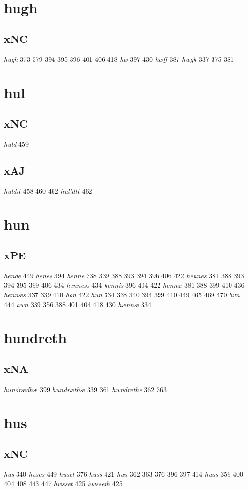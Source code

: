 \documentclass[a4paper,twocolumn]{article}
\begin{document}
\section{hugh}
\label{sec:org77df400}
\subsection{xNC}
\label{sec:org60e1a54}
\emph{hugh} 373 379 394 395 396 401 406 418 \emph{hw} 397 430 \emph{hwff} 387 \emph{hwgh} 337 375 381 
\section{hul}
\label{sec:orgc912211}
\subsection{xNC}
\label{sec:org2108ac0}
\emph{huld} 459 
\subsection{xAJ}
\label{sec:org17b45ab}
\emph{huldtt} 458 460 462 \emph{hulldtt} 462 
\section{hun}
\label{sec:orgfeeb3c3}
\subsection{xPE}
\label{sec:orgb8b504d}
\emph{hende} 449 \emph{henes} 394 \emph{henne} 338 339 388 393 394 396 406 422 \emph{hennes} 381 388 393 394 395 399 406 434 \emph{henness} 434 \emph{hennis} 396 404 422 \emph{hennæ} 381 388 399 410 436 \emph{hennæs} 337 339 410 \emph{hon} 422 \emph{hun} 334 338 340 394 399 410 449 465 469 470 \emph{hvn} 444 \emph{hwn} 339 356 388 401 404 418 430 \emph{hænnæ} 334 
\section{hundreth}
\label{sec:org0ccde03}
\subsection{xNA}
\label{sec:orgc3d8acd}
\emph{hundrædhæ} 399 \emph{hundræthæ} 339 361 \emph{hwndrethe} 362 363 
\section{hus}
\label{sec:org0b4695e}
\subsection{xNC}
\label{sec:org1544ceb}
\emph{hus} 340 \emph{huses} 449 \emph{huset} 376 \emph{huss} 421 \emph{hws} 362 363 376 396 397 414 \emph{hwss} 359 400 404 408 443 447 \emph{hwsset} 425 \emph{hwsseth} 425 
\end{document}
